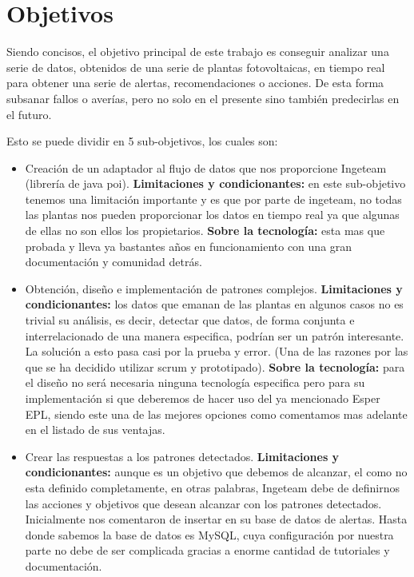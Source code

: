\documentclass[spanish,twoside,openright,12pt,a4paper]{book}
\begin{document}
\section{Objetivos}

Siendo concisos, el objetivo principal de este trabajo es conseguir analizar una serie de datos, obtenidos de una serie de plantas fotovoltaicas, en tiempo real para obtener una serie de alertas, recomendaciones o acciones. De esta forma subsanar fallos o averías, pero no solo en el presente sino también predecirlas en el futuro.

Esto se puede dividir en 5 sub-objetivos, los cuales son:

\begin{itemize}
	\item Creación de un adaptador al flujo de datos que nos proporcione Ingeteam (librería de java poi). \newline
    \textbf{Limitaciones y condicionantes:} en este sub-objetivo tenemos una limitación importante y es que por parte de ingeteam, no todas las plantas nos pueden proporcionar los datos en tiempo real ya que algunas de ellas no son ellos los propietarios.\newline 
    \textbf{Sobre la tecnología:} esta mas que probada y lleva ya bastantes años en funcionamiento con una gran documentación y comunidad detrás.
    
    \item Obtención, diseño e implementación de patrones complejos. \newline
    \textbf{Limitaciones y condicionantes:} los datos que emanan de las plantas en algunos casos no es trivial su análisis, es decir, detectar que datos, de forma conjunta e interrelacionado de una manera especifica, podrían ser un patrón interesante. La solución a esto pasa casi por la prueba y error. (Una de las razones por las que se ha decidido utilizar scrum y prototipado). \newline
    \textbf{Sobre la tecnología:} para el diseño no será necesaria ninguna tecnología especifica pero para su implementación si que deberemos de hacer uso del ya mencionado Esper EPL, siendo este una de las mejores opciones como comentamos mas adelante en el listado de sus ventajas. \newline
    
    \item Crear las respuestas a los patrones detectados. \newline
    \textbf{Limitaciones y condicionantes:} aunque es un objetivo que debemos de alcanzar, el como no esta definido completamente, en otras palabras, Ingeteam debe de definirnos las acciones y objetivos que desean alcanzar con los patrones detectados. Inicialmente nos comentaron de insertar en su base de datos de alertas. Hasta donde sabemos la base de datos es MySQL, cuya configuración por nuestra parte no debe de ser complicada gracias a enorme cantidad de tutoriales y documentación.\newline
    

\end{itemize}
\end{document}

